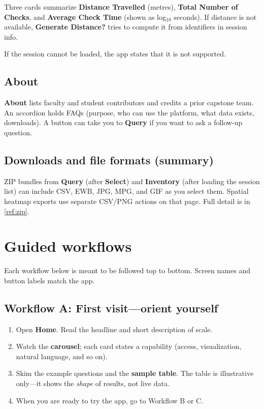 \documentclass{article}
\begin{document}
Three cards summarize \textbf{Distance Travelled} (metres), \textbf{Total Number of Checks}, and \textbf{Average Check Time} (shown as log$_{10}$ seconds). If distance is not available, \textbf{Generate Distance?} tries to compute it from identifiers in session info.

If the session cannot be loaded, the app states that it is not supported.

\subsection{About}
\label{subsec:about-overview}

\textbf{About} lists faculty and student contributors and credits a prior capstone team. An accordion holds FAQs (purpose, who can use the platform, what data exists, downloads). A button can take you to \textbf{Query} if you want to ask a follow-up question.

\subsection{Downloads and file formats (summary)}
\label{subsec:downloads-overview}

ZIP bundles from \textbf{Query} (after \textbf{Select}) and \textbf{Inventory} (after loading the session list) can include CSV, EWB, JPG, MPG, and GIF as you select them. Spatial heatmap exports use separate CSV/PNG actions on that page. Full detail is in \cref{ref:zip}.

\section{Guided workflows}
\label{sec:workflows}

Each workflow below is meant to be followed top to bottom. Screen names and button labels match the app.

\subsection{Workflow A: First visit---orient yourself}
\label{wf:orient}

\begin{enumerate}
  \item Open \textbf{Home}. Read the headline and short description of scale.
  \item Watch the \textbf{carousel}; each card states a capability (access, visualization, natural language, and so on).
  \item Skim the example questions and the \textbf{sample table}. The table is illustrative only---it shows the \emph{shape} of results, not live data.
  \item When you are ready to try the app, go to Workflow B or C.
\end{enumerate}
\end{document}
